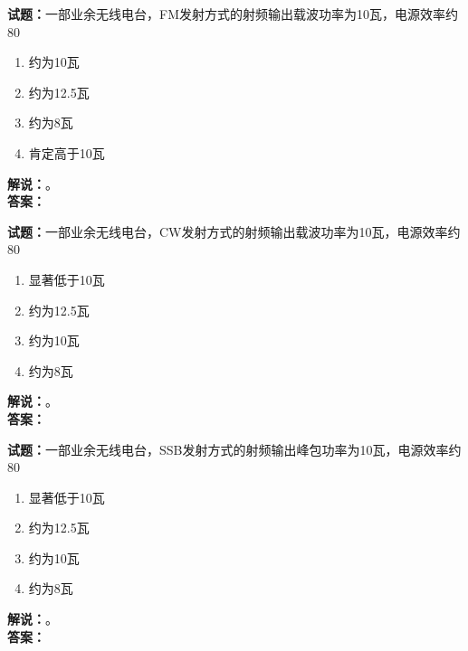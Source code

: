 \documentclass{ctexbook}
\begin{document}
\bigskip




\noindent\textbf{试题：}一部业余无线电台，FM发射方式的射频输出载波功率为10瓦，电源效率约80%
\begin{enumerate}[leftmargin=3em]
\item 约为10瓦
\item 约为12.5瓦
\item 约为8瓦
\item 肯定高于10瓦
\end{enumerate}
\noindent\textbf{解说：}\textbf{}。\\\noindent\textbf{答案：}

\bigskip




\noindent\textbf{试题：}一部业余无线电台，CW发射方式的射频输出载波功率为10瓦，电源效率约80%
\begin{enumerate}[leftmargin=3em]
\item 显著低于10瓦
\item 约为12.5瓦
\item 约为10瓦
\item 约为8瓦
\end{enumerate}
\noindent\textbf{解说：}\textbf{}。\\\noindent\textbf{答案：}

\bigskip




\noindent\textbf{试题：}一部业余无线电台，SSB发射方式的射频输出峰包功率为10瓦，电源效率约80%
\begin{enumerate}[leftmargin=3em]
\item 显著低于10瓦
\item 约为12.5瓦
\item 约为10瓦
\item 约为8瓦
\end{enumerate}
\noindent\textbf{解说：}\textbf{}。\\\noindent\textbf{答案：}

\bigskip


\end{document}
